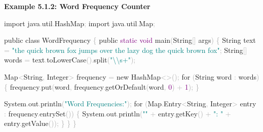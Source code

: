 \documentclass[
  justified,
  openright,
]{tufte-book}
\newcommand{\BuiltInTok}[1]{#1}
\newcommand{\ControlFlowTok}[1]{\textcolor{BrandBlue}{#1}}
\newcommand{\DataTypeTok}[1]{\textcolor{Purple}{#1}}
\newcommand{\DecValTok}[1]{\textcolor{Purple}{#1}}
\newcommand{\FunctionTok}[1]{\textcolor{BrandBlue}{#1}}
\newcommand{\ImportTok}[1]{\textcolor{BrandAccent}{#1}}
\newcommand{\KeywordTok}[1]{\textcolor{BrandBlue}{#1}}
\newcommand{\NormalTok}[1]{#1}
\newcommand{\OperatorTok}[1]{\textcolor{DarkGray}{#1}}
\newcommand{\SpecialCharTok}[1]{\textcolor{Teal}{#1}}
\newcommand{\StringTok}[1]{\textcolor{Teal}{#1}}
\newenvironment{Shaded}{%
  \begin{snugshade}
}{%
  \end{snugshade}
}
\begin{document}
\textbf{Example 5.1.2: Word Frequency Counter}

\begin{Shaded}
\begin{Highlighting}[]
\KeywordTok{import} \ImportTok{java}\OperatorTok{.}\ImportTok{util}\OperatorTok{.}\ImportTok{HashMap}\OperatorTok{;}
\KeywordTok{import} \ImportTok{java}\OperatorTok{.}\ImportTok{util}\OperatorTok{.}\ImportTok{Map}\OperatorTok{;}

\KeywordTok{public} \KeywordTok{class}\NormalTok{ WordFrequency }\OperatorTok{\{}
    \KeywordTok{public} \DataTypeTok{static} \DataTypeTok{void} \FunctionTok{main}\OperatorTok{(}\BuiltInTok{String}\OperatorTok{[]}\NormalTok{ args}\OperatorTok{)} \OperatorTok{\{}
        \BuiltInTok{String}\NormalTok{ text }\OperatorTok{=} \StringTok{"the quick brown fox jumps over the lazy dog the quick brown fox"}\OperatorTok{;}
        \BuiltInTok{String}\OperatorTok{[]}\NormalTok{ words }\OperatorTok{=}\NormalTok{ text}\OperatorTok{.}\FunctionTok{toLowerCase}\OperatorTok{().}\FunctionTok{split}\OperatorTok{(}\StringTok{"}\SpecialCharTok{\textbackslash{}\textbackslash{}}\StringTok{s+"}\OperatorTok{);}

        \BuiltInTok{Map}\OperatorTok{\textless{}}\BuiltInTok{String}\OperatorTok{,} \BuiltInTok{Integer}\OperatorTok{\textgreater{}}\NormalTok{ frequency }\OperatorTok{=} \KeywordTok{new} \BuiltInTok{HashMap}\OperatorTok{\textless{}\textgreater{}();}
        \ControlFlowTok{for} \OperatorTok{(}\BuiltInTok{String}\NormalTok{ word }\OperatorTok{:}\NormalTok{ words}\OperatorTok{)} \OperatorTok{\{}
\NormalTok{            frequency}\OperatorTok{.}\FunctionTok{put}\OperatorTok{(}\NormalTok{word}\OperatorTok{,}\NormalTok{ frequency}\OperatorTok{.}\FunctionTok{getOrDefault}\OperatorTok{(}\NormalTok{word}\OperatorTok{,} \DecValTok{0}\OperatorTok{)} \OperatorTok{+} \DecValTok{1}\OperatorTok{);}
        \OperatorTok{\}}

        \BuiltInTok{System}\OperatorTok{.}\FunctionTok{out}\OperatorTok{.}\FunctionTok{println}\OperatorTok{(}\StringTok{"Word Frequencies:"}\OperatorTok{);}
        \ControlFlowTok{for} \OperatorTok{(}\BuiltInTok{Map}\OperatorTok{.}\FunctionTok{Entry}\OperatorTok{\textless{}}\BuiltInTok{String}\OperatorTok{,} \BuiltInTok{Integer}\OperatorTok{\textgreater{}}\NormalTok{ entry }\OperatorTok{:}\NormalTok{ frequency}\OperatorTok{.}\FunctionTok{entrySet}\OperatorTok{())} \OperatorTok{\{}
            \BuiltInTok{System}\OperatorTok{.}\FunctionTok{out}\OperatorTok{.}\FunctionTok{println}\OperatorTok{(}\StringTok{"\textquotesingle{}"} \OperatorTok{+}\NormalTok{ entry}\OperatorTok{.}\FunctionTok{getKey}\OperatorTok{()} \OperatorTok{+} \StringTok{"\textquotesingle{}: "} \OperatorTok{+}\NormalTok{ entry}\OperatorTok{.}\FunctionTok{getValue}\OperatorTok{());}
        \OperatorTok{\}}
    \OperatorTok{\}}
\OperatorTok{\}}
\end{Highlighting}
\end{Shaded}
\end{document}
